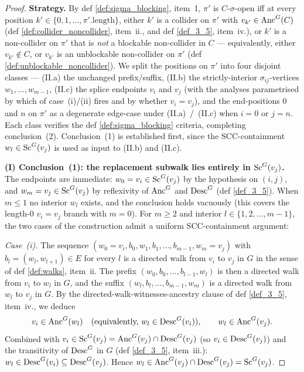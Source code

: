 \begin{Lem}[LabelRoman]
\begin{proof}
\medskip\noindent\textbf{Strategy.}
By def \ref{def:sigma_blocking}, item~1, $\pi'$ is $C$-$\sigma$-open iff at every position $k' \in \{0, 1, \dots, \pi'.\text{length}\}$, either $k'$ is a collider on $\pi'$ with $v_{k'} \in \mathrm{Anc}^G(C)$ (def \ref{def:collider_noncollider}, item~ii., and def \ref{def_3_5}, item~iv.), or $k'$ is a non-collider on $\pi'$ that is \emph{not} a blockable non-collider in $C$ — equivalently, either $v_{k'} \notin C$, or $v_{k'}$ is an unblockable non-collider on $\pi'$ (def \ref{def:unblockable_noncollider}). We split the positions on $\pi'$ into four disjoint classes — (II.a) the unchanged prefix/suffix, (II.b) the strictly-interior $\sigma_{ij}$-vertices $w_1, \dots, w_{m-1}$, (II.c) the splice endpoints $v_i$ and $v_j$ (with the analyses parametrised by which of case~(i)/(ii) fires and by whether $v_i = v_j$), and the end-positions $0$ and $n$ on $\pi'$ as a degenerate edge-case under (II.a)~/~(II.c) when $i = 0$ or $j = n$. Each class verifies the def \ref{def:sigma_blocking} criteria, completing conclusion~(2). Conclusion~(1) is established first, since the SCC-containment $w_l \in \mathrm{Sc}^G(v_j)$ is used as input to (II.b) and (II.c).

\medskip\noindent\textbf{(I) Conclusion~(1): the replacement subwalk lies entirely in $\mathrm{Sc}^G(v_j)$.}
The endpoints are immediate: $w_0 = v_i \in \mathrm{Sc}^G(v_j)$ by the hypothesis on $(i, j)$, and $w_m = v_j \in \mathrm{Sc}^G(v_j)$ by reflexivity of $\mathrm{Anc}^G$ and $\mathrm{Desc}^G$ (def \ref{def_3_5}). When $m \le 1$ no interior $w_l$ exists, and the conclusion holds vacuously (this covers the length-$0$ $v_i = v_j$ branch with $m = 0$). For $m \ge 2$ and interior $l \in \{1, 2, \dots, m-1\}$, the two cases of the construction admit a uniform SCC-containment argument:

\smallskip\noindent\emph{Case~(i).} The sequence $(w_0 = v_i, b_0, w_1, b_1, \dots, b_{m-1}, w_m = v_j)$ with $b_l = (w_l, w_{l+1}) \in E$ for every $l$ is a directed walk from $v_i$ to $v_j$ in $G$ in the sense of def \ref{def:walks}, item~ii. The prefix $(w_0, b_0, \dots, b_{l-1}, w_l)$ is then a directed walk from $v_i$ to $w_l$ in $G$, and the suffix $(w_l, b_l, \dots, b_{m-1}, w_m)$ is a directed walk from $w_l$ to $v_j$ in $G$. By the directed-walk-witnesses-ancestry clause of def \ref{def_3_5}, item~iv., we deduce
\[
    v_i \in \mathrm{Anc}^G(w_l) \quad \text{(equivalently, } w_l \in \mathrm{Desc}^G(v_i)\text{)}, \qquad
    w_l \in \mathrm{Anc}^G(v_j).
\]
Combined with $v_i \in \mathrm{Sc}^G(v_j) = \mathrm{Anc}^G(v_j) \cap \mathrm{Desc}^G(v_j)$ (so $v_i \in \mathrm{Desc}^G(v_j)$) and the transitivity of $\mathrm{Desc}^G$ in $G$ (def \ref{def_3_5}, item~iii.): $w_l \in \mathrm{Desc}^G(v_i) \subseteq \mathrm{Desc}^G(v_j)$. Hence $w_l \in \mathrm{Anc}^G(v_j) \cap \mathrm{Desc}^G(v_j) = \mathrm{Sc}^G(v_j)$.


\end{proof}
\end{Lem}
